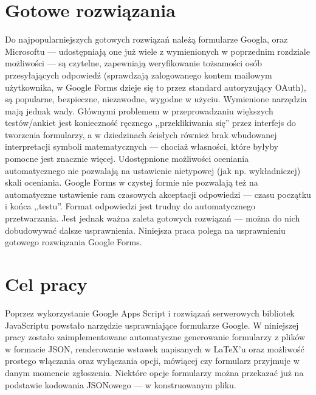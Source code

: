 \section{Gotowe rozwiązania}
Do najpopularniejszych gotowych rozwiązań należą formularze Googla, oraz Microsoftu --- udostępniają one już wiele z  wymienionych w poprzednim rozdziale możliwości --- są czytelne, zapewniają weryfikowanie  tożsamości osób przesyłających odpowiedź (sprawdzają zalogowanego kontem mailowym użytkownika, w Google Forms dzieje się  to przez standard autoryzujący OAuth), są popularne, bezpieczne, niezawodne, wygodne w użyciu.
\ind Wymienione narzędzia mają jednak wady. Głównymi problemem w przeprowadzaniu większych testów/ankiet jest konieczność ręcznego ,,przeklikiwania się'' przez interfejs do tworzenia formularzy, a w dziedzinach ścisłych również brak wbudowanej interpretacji symboli matematycznych --- chociaż własności, które byłyby pomocne jest znacznie więcej. Udostępnione możliwości oceniania automatycznego nie pozwalają na ustawienie nietypowej (jak np. wykładniczej) skali oceniania. Google Forms w czystej formie nie pozwalają też na automatyczne ustawienie ram czasowych akceptacji odpowiedzi --- czasu początku i końca ,,testu''. Format odpowiedzi jest trudny do automatycznego  przetwarzania.
\ind Jest jednak ważna zaleta gotowych rozwiązań --- można do nich dobudowywać dalsze usprawnienia. Niniejsza praca polega na usprawnieniu gotowego rozwiązania Google Forms.
\section{Cel pracy}
 Poprzez wykorzystanie Google Apps Script  i rozwiązań serwerowych bibliotek JavaScriptu powstało narzędzie usprawniające formularze Google. W niniejszej pracy zostało zaimplementowane automatyczne generowanie formularzy z plików w formacie JSON, renderowanie wstawek napisanych w \LaTeX{}'u oraz możliwość prostego włączania oraz wyłączania opcji, mówiącej czy formularz przyjmuje w danym momencie zgłoszenia. Niektóre opcje formularzy można  przekazać już na podstawie kodowania JSONowego --- w konstruowanym pliku.


